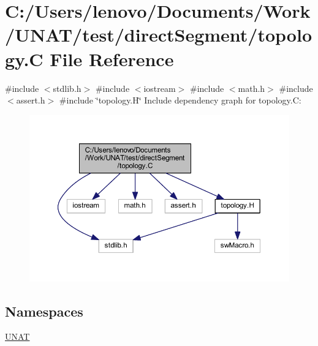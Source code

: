 \hypertarget{test_2directSegment_2topology_8C}{}\section{C\+:/\+Users/lenovo/\+Documents/\+Work/\+U\+N\+A\+T/test/direct\+Segment/topology.C File Reference}
\label{test_2directSegment_2topology_8C}
{\ttfamily \#include $<$stdlib.\+h$>$}\newline
{\ttfamily \#include $<$iostream$>$}\newline
{\ttfamily \#include $<$math.\+h$>$}\newline
{\ttfamily \#include $<$assert.\+h$>$}\newline
{\ttfamily \#include \char`\"{}topology.\+H\char`\"{}}\newline
Include dependency graph for topology.\+C\+:
\nopagebreak
\begin{figure}[H]
\begin{center}
\leavevmode
\includegraphics[width=350pt]{test_2directSegment_2topology_8C__incl}
\end{center}
\end{figure}
\subsection*{Namespaces}
\begin{DoxyCompactItemize}
\item 
 \mbox{\hyperlink{namespaceUNAT}{U\+N\+AT}}
\end{DoxyCompactItemize}
